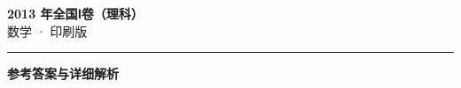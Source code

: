 \documentclass[zihao=5, a4paper]{ctexart}
\begin{document}
\begin{center}
  {\Large\bfseries 2013 年全国Ⅰ卷（理科）}\\[4pt]
  {\large 数学 · 印刷版}
\end{center}
\medskip
{}

\par\bigskip\hrule\bigskip
{}
\begin{center}{\large\bfseries 参考答案与详细解析}\end{center}
\smallskip

\end{document}
